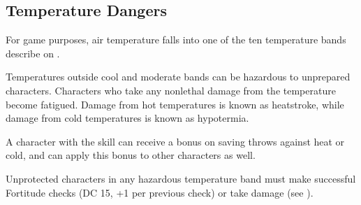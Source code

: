 \subsection{Temperature Dangers}
For game purposes, air temperature falls into one of the ten temperature bands describe on .


Temperatures outside cool and moderate bands can be hazardous to unprepared characters. Characters who take any nonlethal damage from the temperature become fatigued. Damage from hot temperatures is known as heatstroke, while damage from cold temperatures is known as hypotermia.

A character with the  skill can receive a bonus on saving throws against heat or cold, and can apply this bonus to other characters as well.

Unprotected characters in any hazardous temperature band must make successful Fortitude checks (DC 15, +1 per previous check) or take damage (see ).

